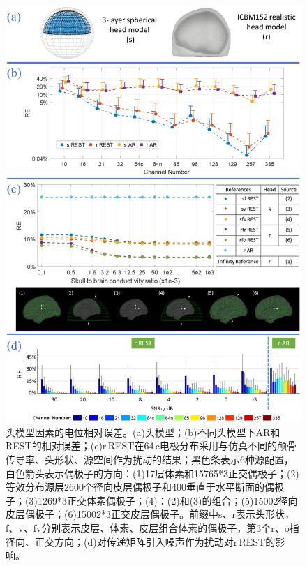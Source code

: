 \begin{figure}[!ht]
	\centering
	\includegraphics[width=12cm]{pic/JNE/figure9.png}
	\caption{头模型因素的电位相对误差。(a)头模型；(b)不同头模型下AR和REST的相对误差；(c)r\,REST在64\,c电极分布采用与仿真不同的颅骨
	传导率、头形状、源空间作为扰动的结果；黑色条表示6种源配置，白色箭头表示偶极子的方向：(1)17层体素和15765*3正交偶极子；(2)等效分布源层2600个径向皮层偶极子和400垂直于水平断面的偶极子；(3)1269*3正交体素偶极子；(4)：(2)和(3)的组合；(5)15002径向皮层偶极子；(6)15002*3正交皮层偶极子。前缀中s、r表示头形状，f、v、fv分别表示皮层、体素、皮层组合体素的偶极子，第3个r、o指径向、正交方向；(d)对传递矩阵引入噪声作为扰动对r\,REST的影响。}
	\label{2:hm}
\end{figure}
